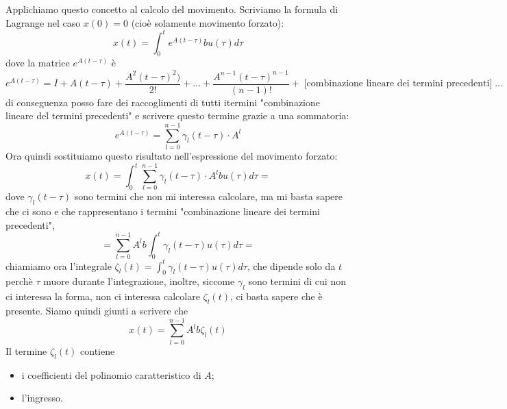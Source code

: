 \newline
Applichiamo questo concetto al calcolo del movimento.\newline
Scriviamo la formula di Lagrange nel caso $x(0) = 0$ (cioè solamente movimento forzato):
\[
    x(t) = \int_{0}^{t}e^{A(t-\tau)} b u(\tau) d \tau
\]
dove la matrice $e^{A(t - \tau)}$ è
\[
    e^{A(t - \tau)} = I +A(t-\tau) + \frac{A^2(t-\tau)^2)}{2!} + \dots + \frac{A^{n-1} (t - \tau)^{n-1}}{(n-1)!} +\; \text{[combinazione lineare dei termini precedenti]}\;\dots 
\]
di conseguenza posso fare dei raccoglimenti di tutti itermini "combinazione lineare del termini precedenti" e scrivere questo termine grazie a una sommatoria:
\[
    e^{A(t - \tau)} = \sum_{l=0}^{n-1} \gamma_l(t-\tau) \cdot  A^l
\]
Ora quindi sostituiamo questo risultato nell'espressione del movimento forzato:
\[
    x(t) = \int_{0}^{t} \sum_{l=0}^{n-1} \gamma_l(t-\tau) \cdot  A^l b u(\tau)d \tau=
\]
dove $\gamma_l(t-\tau)$ sono termini che non mi interessa calcolare, ma mi basta sapere che ci sono e che rappresentano i termini "combinazione lineare dei termini precedenti",
\[
    = \sum_{l=0}^{n-1} A^l b \int_{0}^{t}\gamma_l (t-\tau) u(\tau)d \tau=
\]
chiamiamo ora l'integrale $\zeta_l (t) = \int_{0}^{t}\gamma_l (t-\tau) u(\tau)d \tau$, che dipende solo da $t$ perchè $\tau$ muore durante l'integrazione, inoltre, siccome $\gamma_l$ sono termini di cui non ci interessa la forma, non ci interessa calcolare $\zeta_l (t)$, ci basta sapere che è presente.\newline
\newline
Siamo quindi giunti a scrivere che
\[
    x(t) = \sum_{l=0}^{n-1} A^l b \zeta_l(t)
\]
Il termine $\zeta_l(t)$ contiene
\begin{itemize}
    \item i coefficienti del polinomio caratteristico di $A$;
    \item l'ingresso.
\end{itemize}